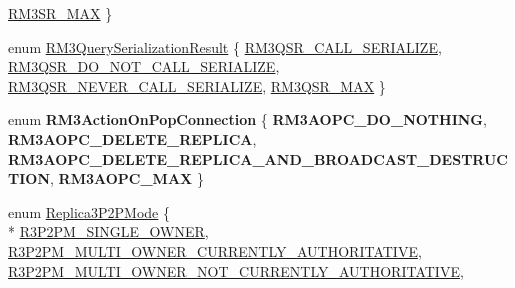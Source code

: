 \begin{DoxyCompactItemize}
\hyperlink{group___r_e_p_l_i_c_a___m_a_n_a_g_e_r___g_r_o_u_p3_gga993da25eb23b67455e2438971c51429cab220e8bd7e6c81016a4436c1767fc48d}{R\-M3\-S\-R\-\_\-\-M\-A\-X}
 \}
\item 
enum \hyperlink{group___r_e_p_l_i_c_a___m_a_n_a_g_e_r___g_r_o_u_p3_ga9a29b413d7f2b9cb21c16457631d3aef}{R\-M3\-Query\-Serialization\-Result} \{ \hyperlink{group___r_e_p_l_i_c_a___m_a_n_a_g_e_r___g_r_o_u_p3_gga9a29b413d7f2b9cb21c16457631d3aefac2394e5a4e4008d90c922bed6932303d}{R\-M3\-Q\-S\-R\-\_\-\-C\-A\-L\-L\-\_\-\-S\-E\-R\-I\-A\-L\-I\-Z\-E}, 
\hyperlink{group___r_e_p_l_i_c_a___m_a_n_a_g_e_r___g_r_o_u_p3_gga9a29b413d7f2b9cb21c16457631d3aefac45e556d9b4239415bd63e5bede8ca51}{R\-M3\-Q\-S\-R\-\_\-\-D\-O\-\_\-\-N\-O\-T\-\_\-\-C\-A\-L\-L\-\_\-\-S\-E\-R\-I\-A\-L\-I\-Z\-E}, 
\hyperlink{group___r_e_p_l_i_c_a___m_a_n_a_g_e_r___g_r_o_u_p3_gga9a29b413d7f2b9cb21c16457631d3aefa22b7a36a8c1481cc6345d8c4efbe4aac}{R\-M3\-Q\-S\-R\-\_\-\-N\-E\-V\-E\-R\-\_\-\-C\-A\-L\-L\-\_\-\-S\-E\-R\-I\-A\-L\-I\-Z\-E}, 
\hyperlink{group___r_e_p_l_i_c_a___m_a_n_a_g_e_r___g_r_o_u_p3_gga9a29b413d7f2b9cb21c16457631d3aefa2cd620253580e8d24a1b7957799c3d7a}{R\-M3\-Q\-S\-R\-\_\-\-M\-A\-X}
 \}
\item 
enum {\bfseries R\-M3\-Action\-On\-Pop\-Connection} \{ {\bfseries R\-M3\-A\-O\-P\-C\-\_\-\-D\-O\-\_\-\-N\-O\-T\-H\-I\-N\-G}, 
{\bfseries R\-M3\-A\-O\-P\-C\-\_\-\-D\-E\-L\-E\-T\-E\-\_\-\-R\-E\-P\-L\-I\-C\-A}, 
{\bfseries R\-M3\-A\-O\-P\-C\-\_\-\-D\-E\-L\-E\-T\-E\-\_\-\-R\-E\-P\-L\-I\-C\-A\-\_\-\-A\-N\-D\-\_\-\-B\-R\-O\-A\-D\-C\-A\-S\-T\-\_\-\-D\-E\-S\-T\-R\-U\-C\-T\-I\-O\-N}, 
{\bfseries R\-M3\-A\-O\-P\-C\-\_\-\-M\-A\-X}
 \}
\item 
enum \hyperlink{group___r_e_p_l_i_c_a___m_a_n_a_g_e_r___g_r_o_u_p3_ga91a588da9d58bc86b8fb7e4f27ddcf7e}{Replica3\-P2\-P\-Mode} \{ \\*
\hyperlink{group___r_e_p_l_i_c_a___m_a_n_a_g_e_r___g_r_o_u_p3_gga91a588da9d58bc86b8fb7e4f27ddcf7eae6bb229afa26313b6aa4c11320e630d5}{R3\-P2\-P\-M\-\_\-\-S\-I\-N\-G\-L\-E\-\_\-\-O\-W\-N\-E\-R}, 
\hyperlink{group___r_e_p_l_i_c_a___m_a_n_a_g_e_r___g_r_o_u_p3_gga91a588da9d58bc86b8fb7e4f27ddcf7ea47ff84aa5cdf83b800d551ab607b1d1f}{R3\-P2\-P\-M\-\_\-\-M\-U\-L\-T\-I\-\_\-\-O\-W\-N\-E\-R\-\_\-\-C\-U\-R\-R\-E\-N\-T\-L\-Y\-\_\-\-A\-U\-T\-H\-O\-R\-I\-T\-A\-T\-I\-V\-E}, 
\hyperlink{group___r_e_p_l_i_c_a___m_a_n_a_g_e_r___g_r_o_u_p3_gga91a588da9d58bc86b8fb7e4f27ddcf7eac0b780c5f936449de42e6032e6bca4e6}{R3\-P2\-P\-M\-\_\-\-M\-U\-L\-T\-I\-\_\-\-O\-W\-N\-E\-R\-\_\-\-N\-O\-T\-\_\-\-C\-U\-R\-R\-E\-N\-T\-L\-Y\-\_\-\-A\-U\-T\-H\-O\-R\-I\-T\-A\-T\-I\-V\-E}, 

\end{DoxyCompactItemize}
